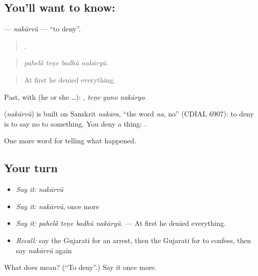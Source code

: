 \subsection*{You'll want to know: }
\textbf{} — \emph{nakārvũ} — \textquotedblleft{}to deny\textquotedblright{}.

\begin{quote}
   .
\end{quote}

\begin{quote}
\emph{pahelā̃ teṇe badhũ nakāryũ.}
\end{quote}

\begin{quote}
At first he denied everything.
\end{quote}

Past, with  (he or she …):   , \emph{teṇe guno nakāryo}.

\begin{cousinweb}
\textbf{} (\emph{nakārvũ}) is built on Sanskrit \emph{nakāra}, \textquotedblleft{}the word \emph{na}, no\textquotedblright{} (CDIAL 6907): to deny is to say no to something. You deny a thing: \textbf{ }.
\end{cousinweb}

\begin{grammarlens}[title={What you've built}]
One more word for telling what happened.
\end{grammarlens}

\subsection*{Your turn}
\begin{itemize}
\raggedright
  \item \emph{Say it:} \emph{nakārvũ}
  \item \emph{Say it:} \emph{nakārvũ}, once more
  \item \emph{Say it:} \emph{pahelā̃ teṇe badhũ nakāryũ.} — At first he denied everything.
  \item \emph{Recall:} say the Gujarati for an arrest, then the Gujarati for to confess, then say \emph{nakārvũ} again
\end{itemize}

\begin{tcolorbox}[breakable,colback=teal!4,colframe=teal!35!black,title={Before you move on}]
What does  mean? (\textquotedblleft{}To deny\textquotedblright{}.) Say it once more.
\end{tcolorbox}
